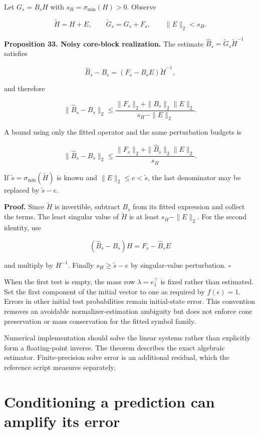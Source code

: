 Let \(G_s=B_sH\) with \(s_H=\sigma_{\min}(H)>0\). Observe

\[
\widetilde H=H+E,\qquad
\widetilde G_s=G_s+F_s,\qquad
\|E\|_2<s_H.
\]

\textbf{Proposition 33. Noisy core-block realization.} The estimate
\(\widehat B_s=\widetilde G_s\widetilde H^{-1}\) satisfies

\[
\widehat B_s-B_s=(F_s-B_sE)\widetilde H^{-1},
\]

and therefore

\[
\boxed{
\|\widehat B_s-B_s\|_2
\leq\frac{\|F_s\|_2+\|B_s\|_2\|E\|_2}{s_H-\|E\|_2}.
}
\]

A bound using only the fitted operator and the same perturbation budgets
is

\[
\|\widehat B_s-B_s\|_2
\leq
\frac{\|F_s\|_2+\|\widehat B_s\|_2\|E\|_2}{s_H}.
\]

If \(\widetilde s=\sigma_{\min}(\widetilde H)\) is known and
\(\|E\|_2\leq e<\widetilde s\), the last denominator may be replaced by
\(\widetilde s-e\).

\textbf{Proof.} Since \(\widetilde H\) is invertible, subtract \(B_s\)
from its fitted expression and collect the terms. The least singular
value of \(\widetilde H\) is at least \(s_H-\|E\|_2\). For the second
identity, use

\[
(\widehat B_s-B_s)H=F_s-\widehat B_sE
\]

and multiply by \(H^{-1}\). Finally \(s_H\geq\widetilde s-e\) by
singular-value perturbation. \(\square\)

When the first test is empty, the mass row \(\lambda=e_1^\top\) is fixed
rather than estimated. Set the first component of the initial vector to
one as required by \(f(\epsilon)=1\). Errors in other initial test
probabilities remain initial-state error. This convention removes an
avoidable normalizer-estimation ambiguity but does not enforce cone
preservation or mass conservation for the fitted symbol family.

Numerical implementation should solve the linear systems rather than
explicitly form a floating-point inverse. The theorem describes the
exact algebraic estimator. Finite-precision solve error is an additional
residual, which the reference script measures separately.

\section{Conditioning a prediction can amplify its error}\label{LSM:conditioning-a-prediction-can-amplify-its-error}

